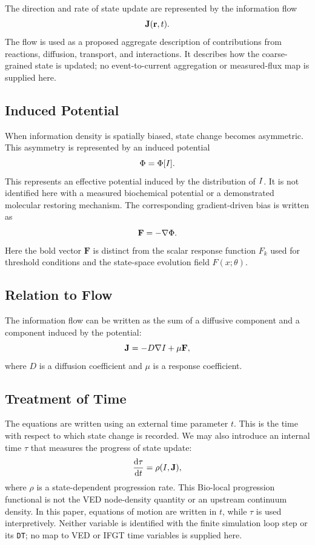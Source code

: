 The direction and rate of state update are represented by the information flow
\begin{equation}
  \mathbf{J}(\mathbf{r},t).
\end{equation}
The flow is used as a proposed aggregate description of contributions from reactions, diffusion, transport, and interactions. It describes how the coarse-grained state is updated; no event-to-current aggregation or measured-flux map is supplied here.

\subsection{Induced Potential}

When information density is spatially biased, state change becomes asymmetric. This asymmetry is represented by an induced potential
\begin{equation}
  \Phi = \Phi[I].
\end{equation}
This represents an effective potential induced by the distribution of \(I\). It is not identified here with a measured biochemical potential or a demonstrated molecular restoring mechanism.
The corresponding gradient-driven bias is written as
\begin{equation}
  \mathbf{F} = -\nabla \Phi.
\end{equation}
Here the bold vector \(\mathbf{F}\) is distinct from the scalar response function \(F_k\) used for threshold conditions and the state-space evolution field \(F(x;\theta)\).

\subsection{Relation to Flow}

The information flow can be written as the sum of a diffusive component and a component induced by the potential:
\begin{equation}
  \mathbf{J} = -D\nabla I + \mu \mathbf{F},
\end{equation}
where \(D\) is a diffusion coefficient and \(\mu\) is a response coefficient.

\subsection{Treatment of Time}

The equations are written using an external time parameter \(t\). This is the time with respect to which state change is recorded. We may also introduce an internal time \(\tau\) that measures the progress of state update:
\begin{equation}
  \frac{\mathrm{d} \tau}{\mathrm{d} t} = \rho(I,\mathbf{J}),
\end{equation}
where \(\rho\) is a state-dependent progression rate. This Bio-local progression functional is not the VED node-density quantity or an upstream continuum density. In this paper, equations of motion are written in \(t\), while \(\tau\) is used interpretively. Neither variable is identified with the finite simulation loop step or its \texttt{DT}; no map to VED or IFGT time variables is supplied here.

